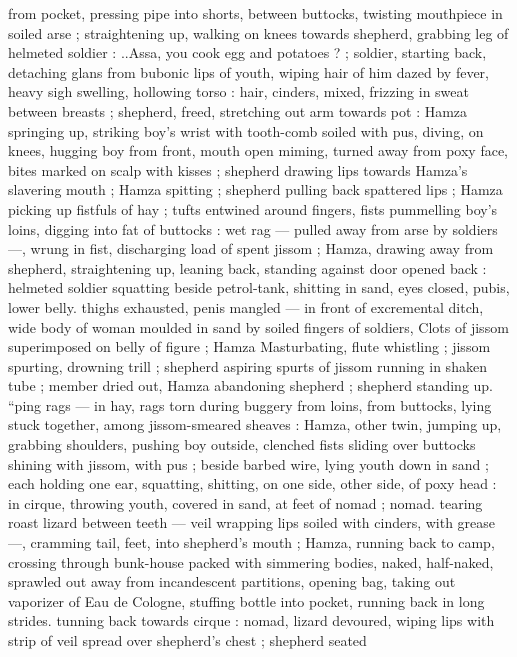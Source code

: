 from pocket, pressing pipe into shorts, between buttocks, twisting 
mouthpiece in soiled arse ; straightening up, walking on knees 
towards shepherd, grabbing leg of helmeted soldier : {\gl}..Assa, you 
cook egg and potatoes ? {\gr} ; soldier, starting back, detaching glans 
from bubonic lips of youth, wiping hair of him dazed by fever, heavy 
sigh swelling, hollowing torso : hair, cinders, mixed, frizzing in sweat 
between breasts ; shepherd, freed, stretching out arm towards pot : 
Hamza springing up, striking boy's wrist with tooth-comb soiled with 
pus, diving, on knees, hugging boy from front, mouth open miming, 
turned away from poxy face, bites marked on scalp with kisses ; 
shepherd drawing lips towards Hamza's slavering mouth ; Hamza 
spitting ; shepherd pulling back spattered lips ; Hamza picking up 
fistfuls of hay ; tufts entwined around fingers, fists pummelling boy's 
loins, digging into fat of buttocks : wet rag --- pulled away from arse 
by soldiers ---, wrung in fist, discharging load of spent jissom ; 
Hamza, drawing away from shepherd, straightening up, leaning back, 
standing against door opened back : helmeted soldier squatting 
beside petrol-tank, shitting in sand, eyes closed, pubis, lower belly. 
thighs exhausted, penis mangled --- in front of excremental ditch, 
wide body of woman moulded in sand by soiled fingers of soldiers, 
Clots of jissom superimposed on belly of figure ; Hamza 
Masturbating, flute whistling ; jissom spurting, drowning trill ; 
shepherd aspiring spurts of jissom running in shaken tube ; member 
dried out, Hamza abandoning shepherd ; shepherd standing up. 
“ping rags --- in hay, rags torn during buggery from loins, from 
buttocks, lying stuck together, among jissom-smeared sheaves : 
Hamza, other twin, jumping up, grabbing shoulders, pushing boy 
outside, clenched fists sliding over buttocks shining with jissom, with 
pus ; beside barbed wire, lying youth down in sand ; each holding 
one ear, squatting, shitting, on one side, other side, of poxy head : 
in cirque, throwing youth, covered in sand, at feet of nomad ; nomad. 
tearing roast lizard between teeth --- veil wrapping lips soiled with 
cinders, with grease ---, cramming tail, feet, into shepherd's mouth 
; Hamza, running back to camp, crossing through bunk-house packed 
with simmering bodies, naked, half-naked, sprawled out away from 
incandescent partitions, opening bag, taking out vaporizer of Eau de 
Cologne, stuffing bottle into pocket, running back in long strides. 
tunning back towards cirque : nomad, lizard devoured, wiping lips 
with strip of veil spread over shepherd's chest ; shepherd seated 
